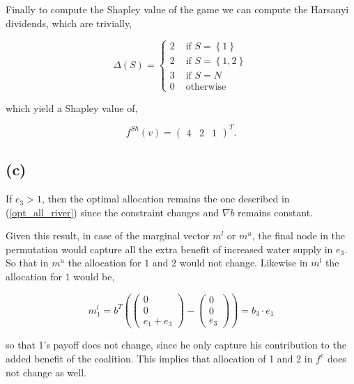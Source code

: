 \documentclass[american]{scrartcl}
\newcommand{\set}[1]{\left\{#1\right\}}
\begin{document}
Finally to compute the Shapley value of the game we can compute the Harsanyi dividends, which are trivially,

\begin{equation}
    \Delta(S)  = \begin{cases}
        2 & \text{ if } S = \set{1}    \\
        2 & \text{ if } S = \set{1, 2} \\
        3 & \text{ if } S = N          \\
        0 & \text{ otherwise }
    \end{cases}
\end{equation}

which yield a Shapley value of,

\begin{equation}
    f^{Sh}(v) = \begin{pmatrix}
        4 & 2 & 1
    \end{pmatrix}^T.
\end{equation}

\subsection*{(c)}

If $e_3 > 1$, then the optimal allocation remains the one described in (\ref{opt_all_river}) since the constraint changes and $\nabla b$ remains constant.

Given this result, in case of the marginal vector $m^l$ or $m^u$, the final node in the permutation would capture all the extra benefit of increased water supply in $e_3$. So that in $m^u$ the allocation for $1$ and $2$ would not change. Likewise in $m^l$ the allocation for $1$ would be,

\begin{equation}
    m^l_1 = b^T \left(\begin{pmatrix}
            0 \\ 0 \\ e_1 + e_3
        \end{pmatrix} - \begin{pmatrix}
            0 \\ 0 \\ e_3
        \end{pmatrix} \right) = b_3 \cdot e_1
\end{equation}

so that 1's payoff does not change, since he only capture his contribution to the added benefit of the coalition. This implies that allocation of 1 and 2 in $f^e$ does not change as well.
\end{document}
